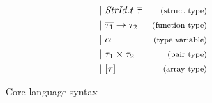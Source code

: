 \begin{figure}[htb]
\begin{align*}
\begin{aligned}
&| \; \mathit{StrId}.t \ \overline{\tau}&\footnotesize\text{(struct type)}\\
&| \; \overline{\tau_{1}} \rightarrow \tau_{2} & \footnotesize\text{(function type)}\\
&| \; \alpha                                   & \footnotesize\text{(type variable)}\\
&| \; \tau_{1} \times \tau_{2}                 & \footnotesize\text{(pair type)}\\
&| \; [\tau]                                   & \footnotesize\text{(array type)}\\
\end{aligned}
\end{align*}
\caption{Core language syntax\label{fig:CoreSyntax}}
\end{figure}
